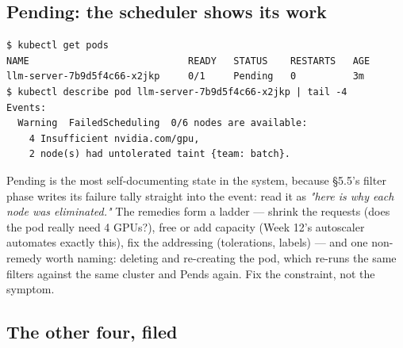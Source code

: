 \subsection*{Pending: the scheduler shows its work}

\begin{terminalbox}
\begin{Verbatim}[breaklines=true,breakanywhere=true,fontsize=\small,formatcom=\color{tbbtermfg},codes=\tbbcodeactive]
$ kubectl get pods
NAME                            READY   STATUS    RESTARTS   AGE
llm-server-7b9d5f4c66-x2jkp     0/1     Pending   0          3m
$ kubectl describe pod llm-server-7b9d5f4c66-x2jkp | tail -4
Events:
  Warning  FailedScheduling  0/6 nodes are available:
    4 Insufficient nvidia.com/gpu,
    2 node(s) had untolerated taint {team: batch}.
\end{Verbatim}
\end{terminalbox}

Pending is the most self-documenting state in the system, because §5.5's filter phase writes its failure tally straight into the event: read it as \textit{"here is why each node was eliminated."} The remedies form a ladder — shrink the requests (does the pod really need 4 GPUs?), free or add capacity (Week 12's autoscaler automates exactly this), fix the addressing (tolerations, labels) — and one non-remedy worth naming: deleting and re-creating the pod, which re-runs the same filters against the same cluster and Pends again. Fix the constraint, not the symptom.

\subsection*{The other four, filed}

